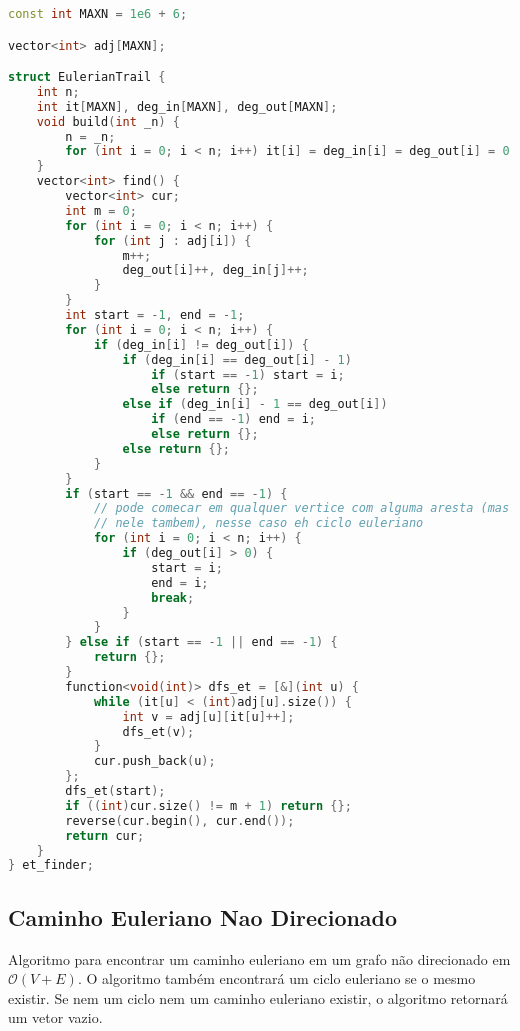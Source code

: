 \documentclass[10pt, a4paper, oneside]{book}
\begin{document}
\begin{lstlisting}[language=C++]
const int MAXN = 1e6 + 6;

vector<int> adj[MAXN];

struct EulerianTrail {
    int n;
    int it[MAXN], deg_in[MAXN], deg_out[MAXN];
    void build(int _n) {
        n = _n;
        for (int i = 0; i < n; i++) it[i] = deg_in[i] = deg_out[i] = 0;
    }
    vector<int> find() {
        vector<int> cur;
        int m = 0;
        for (int i = 0; i < n; i++) {
            for (int j : adj[i]) {
                m++;
                deg_out[i]++, deg_in[j]++;
            }
        }
        int start = -1, end = -1;
        for (int i = 0; i < n; i++) {
            if (deg_in[i] != deg_out[i]) {
                if (deg_in[i] == deg_out[i] - 1)
                    if (start == -1) start = i;
                    else return {};
                else if (deg_in[i] - 1 == deg_out[i])
                    if (end == -1) end = i;
                    else return {};
                else return {};
            }
        }
        if (start == -1 && end == -1) {
            // pode comecar em qualquer vertice com alguma aresta (mas tem que terminar
            // nele tambem), nesse caso eh ciclo euleriano
            for (int i = 0; i < n; i++) {
                if (deg_out[i] > 0) {
                    start = i;
                    end = i;
                    break;
                }
            }
        } else if (start == -1 || end == -1) {
            return {};
        }
        function<void(int)> dfs_et = [&](int u) {
            while (it[u] < (int)adj[u].size()) {
                int v = adj[u][it[u]++];
                dfs_et(v);
            }
            cur.push_back(u);
        };
        dfs_et(start);
        if ((int)cur.size() != m + 1) return {};
        reverse(cur.begin(), cur.end());
        return cur;
    }
} et_finder;
\end{lstlisting}
\hfill

\subsection{Caminho Euleriano Nao Direcionado}


Algoritmo para encontrar um caminho euleriano em um grafo não direcionado em $\mathcal{O}(V + E)$. O algoritmo também encontrará um ciclo euleriano se o mesmo existir. Se nem um ciclo nem um caminho euleriano existir, o algoritmo retornará um vetor vazio.
\end{document}
